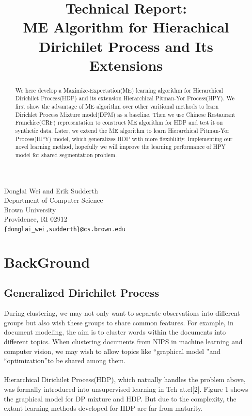 \documentclass{article}
\title{Technical Report:\\ME Algorithm for Hierachical Dirichilet Process and Its Extensions}
\author{}
\begin{document}
Donglai Wei and Erik Sudderth \\
Department of Computer Science\\
Brown University\\
Providence, RI 02912 \\
\texttt{\{donglai\_wei,sudderth\}@cs.brown.edu} \\

\makeanontitle

\begin{abstract}We here develop a Maximize-Expectation(ME) learning algorithm for Hierarchical Dirichilet Process(HDP)
and its extension Hierarchical Pitman-Yor Process(HPY).
We first show the advantage of ME algorithm over other varitional methods to learn Dirichlet Process Mixture model(DPM) as a baseline. 
Then we use Chinese Restaurant Franchise(CRF) representation to construct ME algorithm for HDP and test it on synthetic data. 
Later, we extend the ME algorithm to learn Hierarchical Pitman-Yor Process(HPY) model, which generalizes HDP with more flexiblility. 
Implementing our novel learning method, hopefully we will improve the learning performance of HPY model for shared segmentation problem.

\end{abstract}

\section{BackGround}
\subsection{Generalized Dirichilet Process}
During clustering, we may not only want to separate observations into different groups but also wish these groups to share common features. 
For example, in document modeling, the aim is to cluster words within the documents into different topics. 
When clustering documents from NIPS in machine learning and  computer vision, 
we may wish to allow topics like \textquotedblleft graphical model \textquotedblright and \textquotedblleft optimization\textquotedblright to be shared among them. 
\\ \\
Hierarchical Dirichilet Process(HDP), which natually handles the problem above, was formally introduced into unsupervised learning in Teh at.el[2].
Figure 1 shows the graphical model for DP mixture and HDP. But due to the complexity, the extant learning methods developed for HDP are far from maturity.
\end{document}
